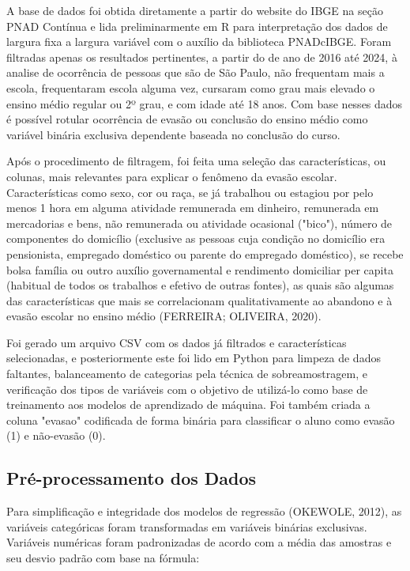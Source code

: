 \documentclass[english, spanish, brazilian]{RBIEarticle} %
\begin{document}
A base de dados foi obtida diretamente a partir do website do IBGE na seção PNAD Contínua e lida preliminarmente em R para interpretação dos dados de largura fixa a largura variável com o auxílio da biblioteca PNADcIBGE. Foram filtradas apenas os resultados pertinentes, a partir do de ano de 2016 até 2024, à analise de ocorrência de pessoas que são de São Paulo, não frequentam mais a escola, frequentaram escola alguma vez, cursaram como grau mais elevado o ensino médio regular ou 2º grau, e com idade até 18 anos. Com base nesses dados é possível rotular ocorrência de evasão ou conclusão do ensino médio como variável binária exclusiva dependente baseada no conclusão do curso.

Após o procedimento de filtragem, foi feita uma seleção das características, ou colunas, mais relevantes para explicar o fenômeno da evasão escolar. Características como sexo, cor ou raça, se já trabalhou ou estagiou por pelo menos 1 hora em alguma atividade remunerada em dinheiro, remunerada em mercadorias e bens, não remunerada ou atividade ocasional ("bico"), número de componentes do domicílio (exclusive as pessoas cuja condição no domicílio era pensionista, empregado doméstico ou parente do empregado doméstico), se recebe bolsa família ou outro auxílio governamental e rendimento domiciliar per capita
(habitual de todos os trabalhos e efetivo de outras fontes), as quais são algumas das características que mais se correlacionam qualitativamente ao abandono e à evasão escolar no ensino médio (FERREIRA; OLIVEIRA, 2020).

Foi gerado um arquivo CSV com os dados já filtrados e características selecionadas, e posteriormente este foi lido em Python para limpeza de dados faltantes, balanceamento de categorias pela técnica de sobreamostragem, e verificação dos tipos de variáveis com o objetivo de utilizá-lo como base de treinamento aos modelos de aprendizado de máquina. Foi também criada a coluna "evasao" codificada de forma binária para classificar o aluno como evasão (1) e não-evasão (0).


\subsection{Pré-processamento dos Dados}
Para simplificação e integridade dos modelos de regressão (OKEWOLE, 2012), as variáveis categóricas foram transformadas em variáveis binárias exclusivas. Variáveis numéricas foram padronizadas de acordo com a média das amostras e seu desvio padrão com base na fórmula:
\end{document}
